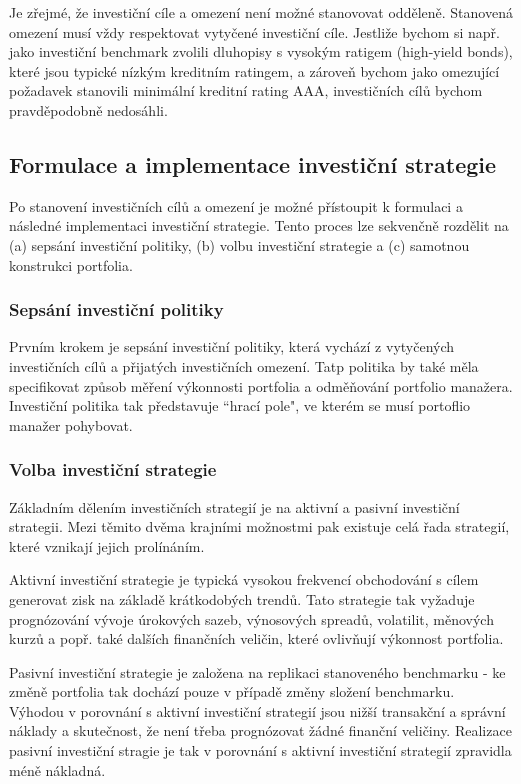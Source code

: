 \documentclass[a4paper]{book}
\begin{document}
Je zřejmé, že investiční cíle a omezení není možné stanovovat odděleně. Stanovená omezení musí vždy respektovat vytyčené investiční cíle. Jestliže bychom si např. jako investiční benchmark zvolili dluhopisy s vysokým ratigem (high-yield bonds), které jsou typické nízkým kreditním ratingem, a zároveň bychom jako omezující požadavek stanovili minimální kreditní rating AAA, investičních cílů bychom pravděpodobně nedosáhli.

\subsection{Formulace a implementace investiční strategie}

Po stanovení investičních cílů a omezení je možné přístoupit k formulaci a následné implementaci investiční strategie. Tento proces lze sekvenčně rozdělit na (a) sepsání investiční politiky, (b) volbu investiční strategie a (c) samotnou konstrukci portfolia.

\subsubsection{Sepsání investiční politiky}

Prvním krokem je sepsání investiční politiky, která vychází z vytyčených investičních cílů a přijatých investičních omezení. Tatp politika by také měla specifikovat způsob měření výkonnosti portfolia a odměňování portfolio manažera. Investiční politika tak představuje ``hrací pole", ve kterém se musí portoflio manažer pohybovat.

\subsubsection{Volba investiční strategie}

Základním dělením investičních strategií je na aktivní a pasivní investiční strategii. Mezi těmito dvěma krajními možnostmi pak existuje celá řada strategií, které vznikají jejich prolínáním.

Aktivní investiční strategie je typická vysokou frekvencí obchodování s cílem generovat zisk na základě krátkodobých trendů. Tato strategie tak vyžaduje prognózování vývoje úrokových sazeb, výnosových spreadů, volatilit, měnových kurzů a popř. také dalších finančních veličin, které ovlivňují výkonnost portfolia.

Pasivní investiční strategie je založena na replikaci stanoveného benchmarku - ke změně portfolia tak dochází pouze v případě změny složení benchmarku.  Výhodou v porovnání s aktivní investiční strategií jsou nižší transakční a správní náklady a skutečnost, že není třeba prognózovat žádné finanční veličiny. Realizace pasivní investiční stragie je tak v porovnání s aktivní investiční strategií zpravidla méně nákladná.
\end{document}
